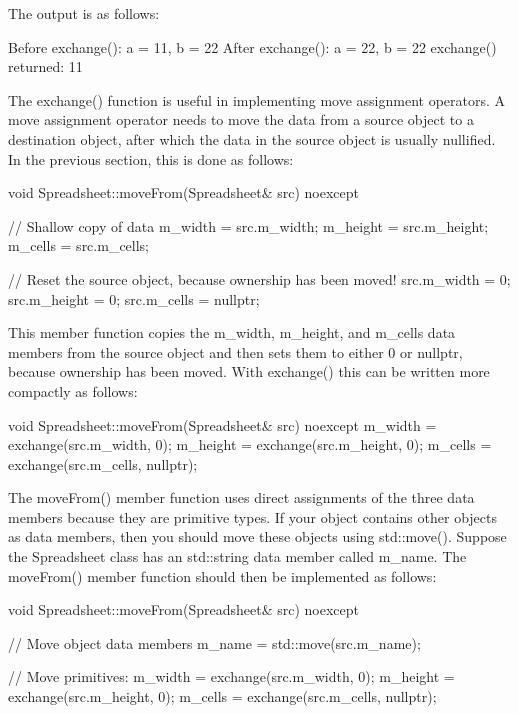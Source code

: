 The output is as follows:

\begin{shell}
Before exchange(): a = 11, b = 22
After exchange(): a = 22, b = 22
exchange() returned: 11
\end{shell}

The exchange() function is useful in implementing move assignment operators. A move assignment operator needs to move the data from a source object to a destination object, after which the data in the source object is usually nullified. In the previous section, this is done as follows:

\begin{cpp}
void Spreadsheet::moveFrom(Spreadsheet& src) noexcept
{
    // Shallow copy of data
    m_width = src.m_width;
    m_height = src.m_height;
    m_cells = src.m_cells;

    // Reset the source object, because ownership has been moved!
    src.m_width = 0;
    src.m_height = 0;
    src.m_cells = nullptr;
}
\end{cpp}

This member function copies the m\_width, m\_height, and m\_cells data members from the source object and then sets them to either 0 or nullptr, because ownership has been moved. With exchange() this can be written more compactly as follows:

\begin{cpp}
void Spreadsheet::moveFrom(Spreadsheet& src) noexcept
{
    m_width = exchange(src.m_width, 0);
    m_height = exchange(src.m_height, 0);
    m_cells = exchange(src.m_cells, nullptr);
}
\end{cpp}


The moveFrom() member function uses direct assignments of the three data members because they are primitive types. If your object contains other objects as data members, then you should move these objects using std::move(). Suppose the Spreadsheet class has an std::string data member called m\_name. The moveFrom() member function should then be implemented as follows:

\begin{cpp}
void Spreadsheet::moveFrom(Spreadsheet& src) noexcept
{
    // Move object data members
    m_name = std::move(src.m_name);

    // Move primitives:
    m_width = exchange(src.m_width, 0);
    m_height = exchange(src.m_height, 0);
    m_cells = exchange(src.m_cells, nullptr);
}
\end{cpp}

